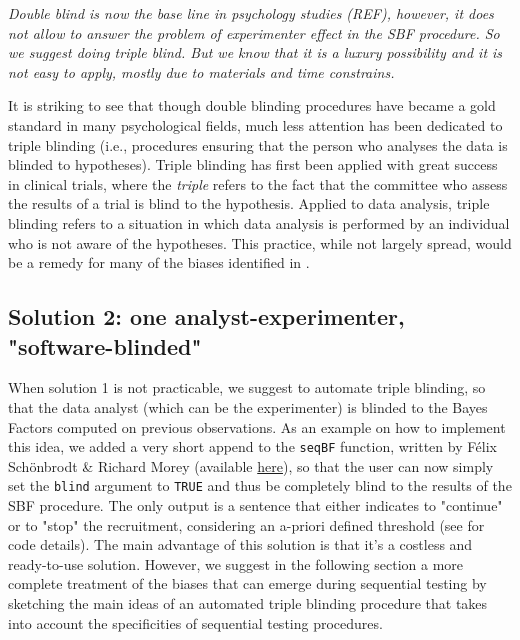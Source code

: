 \documentclass[a4paper,man,natbib,floatsintext,donotrepeattitle]{apa6}
\begin{document}
\textit{Double blind is now the base line in psychology studies (REF), however, it does not allow to answer the problem of experimenter effect in the SBF procedure. So we suggest doing triple blind. But we know that it is a luxury possibility and it is not easy to apply, mostly due to materials and time constrains.}


It is striking to see that though double blinding procedures have became a gold standard in many psychological fields, much less attention has been dedicated to triple blinding (i.e., procedures ensuring that the person who analyses the data is blinded to hypotheses). Triple blinding has first been applied with great success in clinical trials, where the \textit{triple} refers to the fact that the committee who assess the results of a trial is blind to the hypothesis. Applied to data analysis, triple blinding refers to a situation in which data analysis is performed by an individual who is not aware of the hypotheses. This practice, while not largely spread, would be a remedy for many of the biases identified in \cite{wicherts_degrees_2016}.

\subsection{Solution 2: one analyst-experimenter, "software-blinded"}
When solution 1 is not practicable, we suggest to automate triple blinding, so that the data analyst (which can be the experimenter) is blinded to the Bayes Factors computed on previous observations. As an example on how to implement this idea, we added a very short append to the \texttt{seqBF} function, written by Félix Schönbrodt \& Richard Morey (available \href{https://raw.githubusercontent.com/richarddmorey/BayesFactorExtras/master/BayesFactorExtras/R/seqBF.R}{here}), so that the user can now simply set the \texttt{blind} argument to \texttt{TRUE} and thus be completely blind to the results of the SBF procedure. The only output is a sentence that either indicates to "continue" or to "stop" the recruitment, considering an a-priori defined threshold (see  for code details). The main advantage of this solution is that it's a costless and ready-to-use solution. However, we suggest in the following section a more complete treatment of the biases that can emerge during sequential testing by sketching the main ideas of an automated triple blinding procedure that takes into account the specificities of sequential testing procedures.
\end{document}
